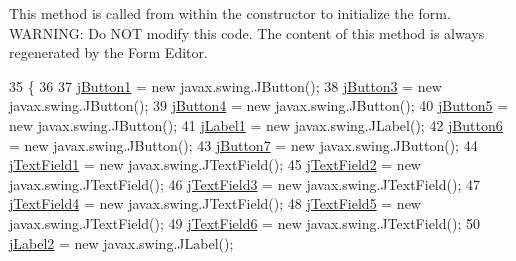 This method is called from within the constructor to initialize the form. W\+A\+R\+N\+I\+NG\+: Do N\+OT modify this code. The content of this method is always regenerated by the Form Editor. 
\begin{DoxyCode}
35                                   \{
36 
37         \mbox{\hyperlink{class_interfaz_package_1_1_consulta_busqueda_a8cbb600ad394d0017b1f7fd24090eae5}{jButton1}} = \textcolor{keyword}{new} javax.swing.JButton();
38         \mbox{\hyperlink{class_interfaz_package_1_1_consulta_busqueda_ad28b7024dc55d1785ac611b91dab6030}{jButton3}} = \textcolor{keyword}{new} javax.swing.JButton();
39         \mbox{\hyperlink{class_interfaz_package_1_1_consulta_busqueda_a3c5a2c3d6a507e80ad771d8ab4ebd891}{jButton4}} = \textcolor{keyword}{new} javax.swing.JButton();
40         \mbox{\hyperlink{class_interfaz_package_1_1_consulta_busqueda_a92a758e63cc825dd1292869d625115dd}{jButton5}} = \textcolor{keyword}{new} javax.swing.JButton();
41         \mbox{\hyperlink{class_interfaz_package_1_1_consulta_busqueda_a53ca3d311b9b50620390029bffe04529}{jLabel1}} = \textcolor{keyword}{new} javax.swing.JLabel();
42         \mbox{\hyperlink{class_interfaz_package_1_1_consulta_busqueda_a7cf19c14b7eb6a2bd1e460fcce0c2ffa}{jButton6}} = \textcolor{keyword}{new} javax.swing.JButton();
43         \mbox{\hyperlink{class_interfaz_package_1_1_consulta_busqueda_a80ca243a28d5b45e1f3a0e97c5cfb819}{jButton7}} = \textcolor{keyword}{new} javax.swing.JButton();
44         \mbox{\hyperlink{class_interfaz_package_1_1_consulta_busqueda_a268df17df2147b480825a6af3128683e}{jTextField1}} = \textcolor{keyword}{new} javax.swing.JTextField();
45         \mbox{\hyperlink{class_interfaz_package_1_1_consulta_busqueda_aa92702c5bdc2128ce8e45ce2edd99543}{jTextField2}} = \textcolor{keyword}{new} javax.swing.JTextField();
46         \mbox{\hyperlink{class_interfaz_package_1_1_consulta_busqueda_a1898d78ec07cfb8e5e74b50bce3e6239}{jTextField3}} = \textcolor{keyword}{new} javax.swing.JTextField();
47         \mbox{\hyperlink{class_interfaz_package_1_1_consulta_busqueda_a1955bd4179b98e109c23fb701af55b5d}{jTextField4}} = \textcolor{keyword}{new} javax.swing.JTextField();
48         \mbox{\hyperlink{class_interfaz_package_1_1_consulta_busqueda_a62b77207a9f1d648087f776c36b92c4a}{jTextField5}} = \textcolor{keyword}{new} javax.swing.JTextField();
49         \mbox{\hyperlink{class_interfaz_package_1_1_consulta_busqueda_a98f9196a81f18bfd45672e1c4605d68a}{jTextField6}} = \textcolor{keyword}{new} javax.swing.JTextField();
50         \mbox{\hyperlink{class_interfaz_package_1_1_consulta_busqueda_a875cc70442f93c7e077251d0fb0f30f9}{jLabel2}} = \textcolor{keyword}{new} javax.swing.JLabel();

\end{DoxyCode}
